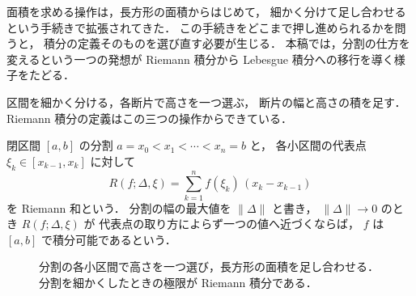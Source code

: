 \documentclass[lualatex,paper=b5j,fontsize=10pt,twoside]{jlreq}
\begin{document}
\setcounter{page}{12}

\MKMakeTitle
\MKArticleReset

面積を求める操作は，長方形の面積からはじめて，
細かく分けて足し合わせるという手続きで拡張されてきた．
この手続きをどこまで押し進められるかを問うと，
積分の定義そのものを選び直す必要が生じる．
本稿では，分割の仕方を変えるという一つの発想が
Riemann 積分から Lebesgue 積分への移行を導く様子をたどる．


区間を細かく分ける，各断片で高さを一つ選ぶ，
断片の幅と高さの積を足す．
Riemann 積分の定義はこの三つの操作からできている．


閉区間 $[a,b]$ の分割
$a=x_0<x_1<\cdots<x_n=b$ と，
各小区間の代表点 $\xi_k\in[x_{k-1},x_k]$ に対して
\begin{equation}
  R(f;\Delta,\xi)
    =\sum_{k=1}^{n}f(\xi_k)\,(x_k-x_{k-1})
\end{equation}
を Riemann 和という．
分割の幅の最大値を $\lVert\Delta\rVert$ と書き，
$\lVert\Delta\rVert\to0$ のとき $R(f;\Delta,\xi)$ が
代表点の取り方によらず一つの値へ近づくならば，
$f$ は $[a,b]$ で積分可能であるという．

\begin{figure}[t]
  \begin{mkfigurebody}
  \end{mkfigurebody}
  \caption{分割の各小区間で高さを一つ選び，長方形の面積を足し合わせる．
    分割を細かくしたときの極限が Riemann 積分である．}
\end{figure}
\end{document}
